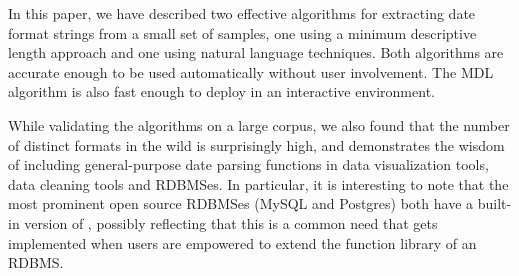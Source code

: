 In this paper, we have described two effective algorithms for extracting date format strings from a small set of samples, one using a minimum descriptive length approach and one using natural language techniques. Both algorithms are accurate enough to be used automatically without user involvement. The MDL algorithm is also fast enough to deploy in an interactive environment.

While validating the algorithms on a large corpus, we also found that the number of distinct formats in the wild is surprisingly high, and demonstrates the wisdom of including general-purpose date parsing functions in data visualization tools, data cleaning tools and RDBMSes. In particular, it is interesting to note that the most prominent open source RDBMSes (\eg MySQL and Postgres) both have a built-in version of \dateparse, possibly reflecting that this is a common need that gets implemented when users are empowered to extend the function library of an RDBMS.
